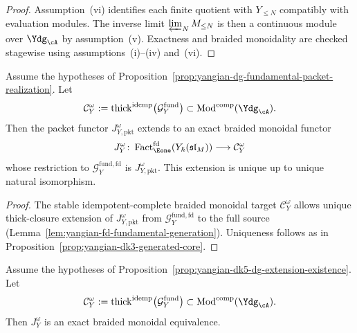 \begin{proof}
Assumption~\textup{(vi)} identifies each finite quotient with
\(Y_{\le N}\) compatibly with evaluation modules. The inverse limit
\(\varprojlim_N M_{\le N}\) is then a continuous module over
\(\Ydg_{\cA}\) by assumption~\textup{(v)}. Exactness and braided
monoidality are checked stagewise using
assumptions~\textup{(i)}--\textup{(iv)} and~\textup{(vi)}.
\end{proof}

\begin{proposition}
\label{prop:yangian-dk5-dg-extension-existence}
Assume the hypotheses of
Proposition~\ref{prop:yangian-dg-fundamental-packet-realization}. Let
\[
\mathcal{C}_Y^\omega
:=
\operatorname{thick}^{\mathrm{idemp}}
\bigl(\mathcal{G}^{\mathrm{fund}}_{Y}\bigr)
\subset
\operatorname{Mod}^{\mathrm{comp}}(\Ydg_{\cA}).
\]
Then the packet functor \(J_{Y,\mathrm{pkt}}^\omega\) extends to an
exact braided monoidal functor
\[
J_Y^\omega\colon
\operatorname{Fact}_{\Eone}^{\mathrm{fd}}(Y_\hbar(\mathfrak{sl}_M))
\longrightarrow
\mathcal{C}_Y^\omega
\]
whose restriction to \(\mathcal{G}^{\mathrm{fund,fd}}_{Y}\) is
\(J_{Y,\mathrm{pkt}}^\omega\). This extension is unique up to unique
natural isomorphism.

\end{proposition}

\begin{proof}
The stable idempotent-complete braided monoidal target
\(\mathcal{C}_Y^\omega\) allows unique thick-closure extension of
\(J_{Y,\mathrm{pkt}}^\omega\) from
\(\mathcal{G}^{\mathrm{fund,fd}}_{Y}\) to the full source
(Lemma~\ref{lem:yangian-fd-fundamental-generation}). Uniqueness
follows as in
Proposition~\ref{prop:yangian-dk3-generated-core}.
\end{proof}

\begin{proposition}
\label{prop:yangian-dk5-dg-realization-formal}
Assume the hypotheses of
Proposition~\ref{prop:yangian-dk5-dg-extension-existence}. Let
\[
\mathcal{C}_Y^\omega
:=
\operatorname{thick}^{\mathrm{idemp}}
\bigl(\mathcal{G}^{\mathrm{fund}}_{Y}\bigr)
\subset
\operatorname{Mod}^{\mathrm{comp}}(\Ydg_{\cA}).
\]
Then \(J_Y^\omega\) is an exact braided monoidal equivalence.

\end{proposition}

